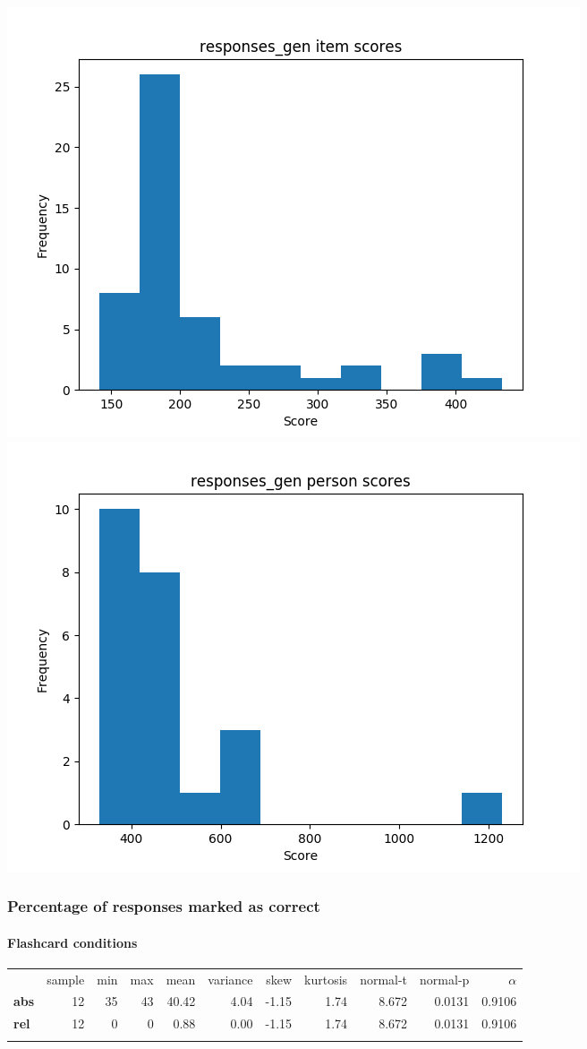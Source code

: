 \documentclass[]{article}
\begin{document}
\includegraphics{responses_gen_diff.png}
\includegraphics{responses_gen_abil.png}

\subsubsection{Percentage of responses marked as
correct}\label{percentage-of-responses-marked-as-correct}

\FloatBarrier
\paragraph{Flashcard conditions}\label{flashcard-conditions-1}

\begin{longtable}[c]{@{}lrrrrrrrrrr@{}}
\toprule\addlinespace
& sample & min & max & mean & variance & skew & kurtosis & normal-t &
normal-p & $\alpha$
\\\addlinespace
\midrule\endhead
\textbf{abs} & 12 & 35 & 43 & 40.42 & 4.04 & -1.15 & 1.74 & 8.672 &
0.0131 & 0.9106
\\\addlinespace
\textbf{rel} & 12 & 0 & 0 & 0.88 & 0.00 & -1.15 & 1.74 & 8.672 & 0.0131
& 0.9106
\\\addlinespace
\bottomrule
\end{longtable}
\end{document}
